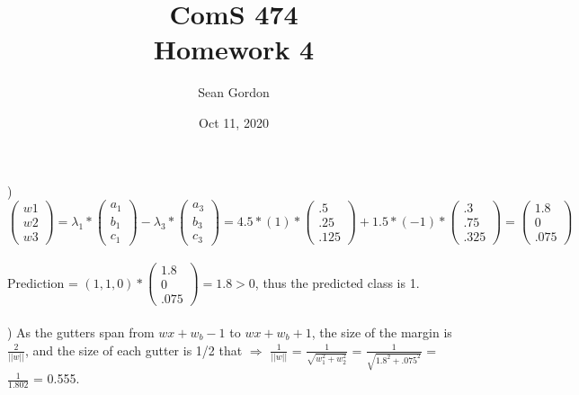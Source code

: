 \documentclass[12pt]{article}
\title{ComS 474\\Homework 4}
\author{Sean Gordon}
\date{Oct 11, 2020}
\begin{document}
\maketitle



) $
\begin{pmatrix}
w1\\ w2\\ w3
\end{pmatrix}
= \lambda_1 *
\begin{pmatrix}
a_1\\ b_1\\ c_1
\end{pmatrix}
- \lambda_3 *
\begin{pmatrix}
a_3\\ b_3\\ c_3
\end{pmatrix}
= 4.5 * (1) *
\begin{pmatrix}
.5\\ .25\\ .125
\end{pmatrix}
+ 1.5 * (-1) *
\begin{pmatrix}
.3\\ .75\\ .325
\end{pmatrix}
=
\begin{pmatrix}
1.8\\ 0\\ .075
\end{pmatrix}$\\\\

Prediction = $(1, 1, 0)*
\begin{pmatrix}
1.8\\ 0\\ .075
\end{pmatrix}
= 1.8 > 0$, thus the predicted class is 1.\\



\noindent \hrulefill \\



) As the gutters span from $wx+w_b-1$ to $wx+w_b+1$, the size of the margin is {\Large$\frac{2}{||w||}$}, and the size of each gutter is 1/2 that $\Rightarrow$ {\Large$\frac{1}{||w||}$} = {\Large$\frac{1}{\sqrt{w_1^2+w_2^2}}$} = {\Large$\frac{1}{\sqrt{1.8^2+.075^2}}$} = {\Large$\frac{1}{1.802}$} = 0.555.
\end{document}
